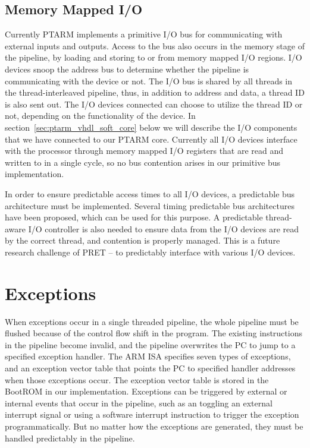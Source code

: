 \subsection{Memory Mapped I/O}
Currently PTARM implements a primitive I/O bus for communicating with external inputs and outputs.
Access to the bus also occurs in the memory stage of the pipeline, by loading and storing to or from memory mapped I/O regions.
I/O devices snoop the address bus to determine whether the pipeline is communicating with the device or not.
The I/O bus is shared by all threads in the thread-interleaved pipeline, thus, in addition to address and data, a thread ID is also sent out. 
The I/O devices connected can choose to utilize the thread ID or not, depending on the functionality of the device. 
In section~\ref{sec:ptarm_vhdl_soft_core} below we will describe the I/O components that we have connected to our PTARM core.
Currently all I/O devices interface with the processor through memory mapped I/O registers that are read and written to in a single cycle, so no bus contention arises in our primitive bus implementation.

In order to ensure predictable access times to all I/O devices, a predictable bus architecture must be implemented.   
Several timing predictable bus architectures~ have been proposed, which can be used for this purpose. 
A predictable thread-aware I/O controller is also needed to ensure data from the I/O devices are read by the correct thread, and contention is properly managed.  
This is a future research challenge of PRET -- to predictably interface with various I/O devices.    

\section{Exceptions}
\label{subsec:exception_handling_in_ptarm}
When exceptions occur in a single threaded pipeline, the whole pipeline must be flushed because of the control flow shift in the program. 
The existing instructions in the pipeline become invalid, and the pipeline overwrites the PC to jump to a specified exception handler. 
The ARM ISA specifies seven types of exceptions, and an exception vector table that points the PC to specified handler addresses when those exceptions occur. 
The exception vector table is stored in the BootROM in our implementation.
Exceptions can be triggered by external or internal events that occur in the pipeline, such as an toggling an external interrupt signal or using a software interrupt instruction to trigger the exception programmatically.
But no matter how the exceptions are generated, they must be handled predictably in the pipeline.
 
